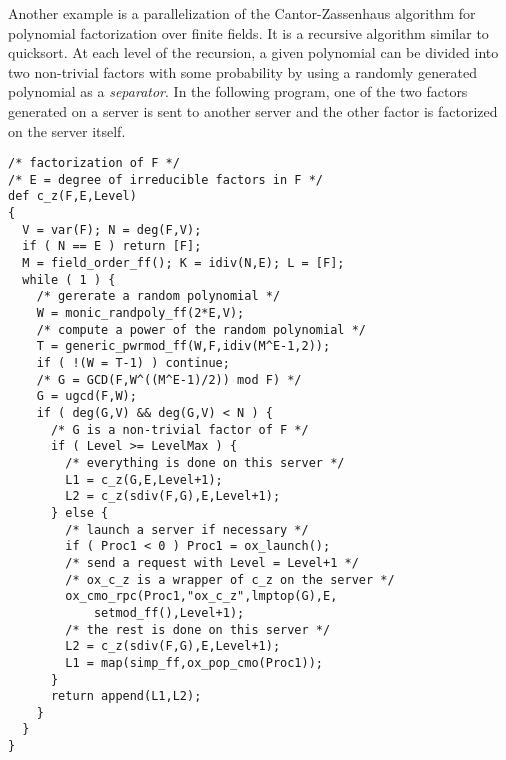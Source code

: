Another example is a parallelization of the Cantor-Zassenhaus
algorithm for polynomial factorization over finite fields.
It is a recursive algorithm similar to quicksort.
At each level of the recursion, a given polynomial can be
divided into two non-trivial factors with some probability by using 
a randomly generated polynomial as a {\it separator}.
In the following program, one of the two factors generated on a server
is sent to another server and the other factor is factorized on the server
itself. 
\begin{verbatim}
/* factorization of F */
/* E = degree of irreducible factors in F */
def c_z(F,E,Level)
{
  V = var(F); N = deg(F,V);
  if ( N == E ) return [F];
  M = field_order_ff(); K = idiv(N,E); L = [F];
  while ( 1 ) {
    /* gererate a random polynomial */
    W = monic_randpoly_ff(2*E,V);
    /* compute a power of the random polynomial */
    T = generic_pwrmod_ff(W,F,idiv(M^E-1,2));
    if ( !(W = T-1) ) continue;
    /* G = GCD(F,W^((M^E-1)/2)) mod F) */
    G = ugcd(F,W);
    if ( deg(G,V) && deg(G,V) < N ) {
      /* G is a non-trivial factor of F */
      if ( Level >= LevelMax ) {
        /* everything is done on this server */
        L1 = c_z(G,E,Level+1);
        L2 = c_z(sdiv(F,G),E,Level+1);
      } else {
        /* launch a server if necessary */
        if ( Proc1 < 0 ) Proc1 = ox_launch();
        /* send a request with Level = Level+1 */
        /* ox_c_z is a wrapper of c_z on the server */
        ox_cmo_rpc(Proc1,"ox_c_z",lmptop(G),E,
            setmod_ff(),Level+1);
        /* the rest is done on this server */
        L2 = c_z(sdiv(F,G),E,Level+1);
        L1 = map(simp_ff,ox_pop_cmo(Proc1));
      }
      return append(L1,L2);
    }
  }
}
\end{verbatim}







